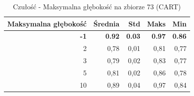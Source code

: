 \begin{table}[htbp]
\centering
\small
\setlength{\tabcolsep}{6pt}
\renewcommand{\arraystretch}{1.2}
\caption{Czułość - Maksymalna głębokość na zbiorze 73 (CART)}
\label{tab:CART_max_depth_73_recall}
\begin{tabular}{r|r|r|r|r}
\toprule
Maksymalna głębokość & Średnia & Std & Maks & Min \\
\hline
\textbf{-1} & \textbf{0.92} & \textbf{0.03} & \textbf{0.97} & \textbf{0.86} \\
2 & 0,78 & 0,01 & 0,81 & 0,77 \\
3 & 0,79 & 0,02 & 0,83 & 0,77 \\
5 & 0,81 & 0,02 & 0,86 & 0,78 \\
10 & 0,89 & 0,04 & 0,97 & 0,84 \\
\bottomrule
\end{tabular}
\end{table}